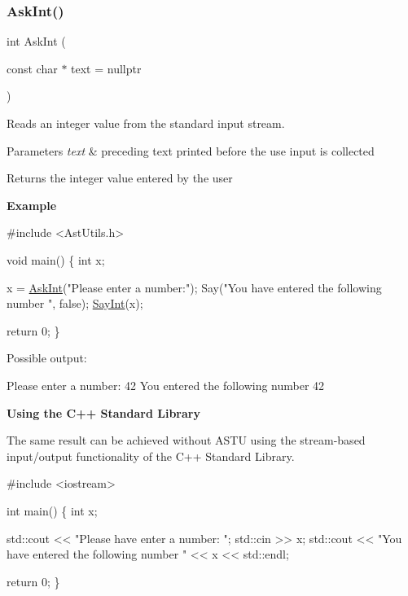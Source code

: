 \subsubsection{\texorpdfstring{Ask\+Int()}{AskInt()}}
{\footnotesize\ttfamily int Ask\+Int (\begin{DoxyParamCaption}\item[{const char $\ast$}]{text = {\ttfamily nullptr} }\end{DoxyParamCaption})}

Reads an integer value from the standard input stream.


\begin{DoxyParams}{Parameters}
{\em text} & preceding text printed before the use input is collected \\
\hline
\end{DoxyParams}
\begin{DoxyReturn}{Returns}
the integer value entered by the user
\end{DoxyReturn}
{\bfseries Example} 
\begin{DoxyCode}
\textcolor{preprocessor}{#include <AstUtils.h>}

\textcolor{keywordtype}{void} main()
\{
  \textcolor{keywordtype}{int} x;

  x = \hyperlink{group__io__group_gae3d41902eb45488b04016096918d605c}{AskInt}(\textcolor{stringliteral}{"Please enter a number:"});
  Say(\textcolor{stringliteral}{"You have entered the following number "}, \textcolor{keyword}{false});
  \hyperlink{group__io__group_gaa78da65e44d9ab5e70c79ed77f62b86a}{SayInt}(x);

  \textcolor{keywordflow}{return} 0;
\}
\end{DoxyCode}
 Possible output\+: 
\begin{DoxyCode}
Please enter a number: 42
You entered the following number 42
\end{DoxyCode}


{\bfseries Using the C++ Standard Library}

The same result can be achieved without A\+S\+TU using the stream-\/based input/output functionality of the C++ Standard Library.


\begin{DoxyCode}
\textcolor{preprocessor}{#include <iostream>}

\textcolor{keywordtype}{int} main()
\{
  \textcolor{keywordtype}{int} x;

  std::cout << \textcolor{stringliteral}{"Please have enter a number: "};
  std::cin >> x;
  std::cout << \textcolor{stringliteral}{"You have entered the following number "} << x << std::endl;

  \textcolor{keywordflow}{return} 0;
\}
\end{DoxyCode}
 \mbox{\label{group__io__group_ga89af41351370788f6b9d33fd0bd89d91}} 
